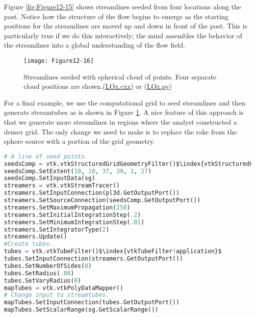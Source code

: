 \noindent Figure \ref{fig:Figure12-15} shows streamlines seeded from four locations along the post.
Notice how the structure of the flow begins to emerge as the starting positions for the streamlines are moved up and down in front of the post. This is particularly true if we do this interactively; the mind assembles the behavior of the streamlines into a global understanding of the flow field.

\begin{figure}[!htb]
    \centering
    \texttt{[image: Figure12-16]}
    \caption{Streamlines seeded with spherical cloud of points. Four separate cloud positions are shown.(\href{https://lorensen.github.io/VTKExamples/site/Cxx/VisualizationAlgorithms/LOx/}{LOx.cxx}) or (\href{https://lorensen.github.io/VTKExamples/site/Python/VisualizationAlgorithms/LOx/}{LOx.py})}
    \label{fig:Figure12-16}
\end{figure}

\clearpage
For a final example, we use the computational grid to seed streamlines and then generate streamtubes as is shown in Figure \ref{fig:Figure12-16}. A nice feature of this approach is that we generate more streamlines in regions where the analyst constructed a denser grid. The only change we need to make is to replace the rake from the sphere source with a portion of the grid geometry.

\begin{lstlisting}[language=Python, caption={Use the computational grid to seed streamlines and then generate streamtubes.}, escapechar=\$]
# A line of seed points.
seedsComp = vtk.vtkStructuredGridGeometryFilter()$\index{vtkStructuredGridGeometryFilter!application}$
seedsComp.SetExtent(10, 10, 37, 39, 1, 27)
seedsComp.SetInputData(sg)
streamers = vtk.vtkStreamTracer()
streamers.SetInputConnection(pl3d.GetOutputPort())
streamers.SetSourceConnection(seedsComp.GetOutputPort())
streamers.SetMaximumPropagation(250)
streamers.SetInitialIntegrationStep(.2)
streamers.SetMinimumIntegrationStep(.01)
streamers.SetIntegratorType(2)
streamers.Update()
#Create tubes.
tubes = vtk.vtkTubeFilter()$\index{vtkTubeFilter!application}$
tubes.SetInputConnection(streamers.GetOutputPort())
tubes.SetNumberOfSides(8)
tubes.SetRadius(.08)
tubes.SetVaryRadius(0)
mapTubes = vtk.vtkPolyDataMapper()
# Change input to streamtubes.
mapTubes.SetInputConnection(tubes.GetOutputPort())
mapTubes.SetScalarRange(sg.GetScalarRange())
\end{lstlisting}

